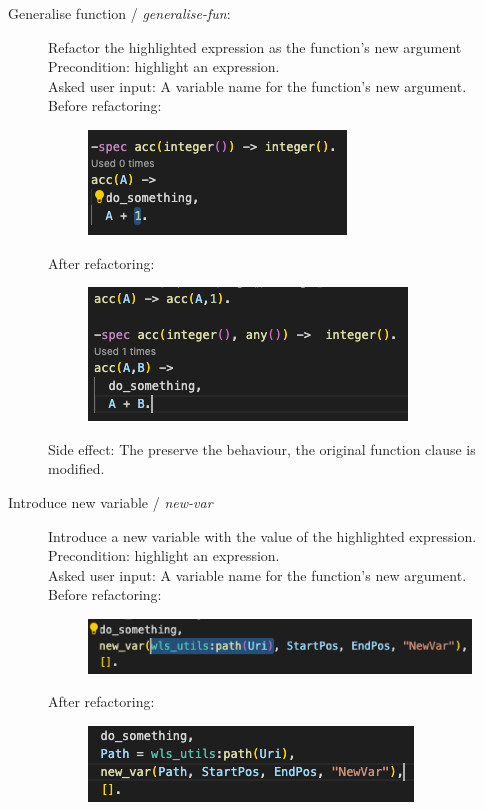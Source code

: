\begin{description}
	\item[Generalise function / \textit{generalise-fun}:] 
	Refactor the highlighted expression as the function's new argument
	\\Precondition: highlight an expression.
	\\Asked user input: A variable name for the function's new argument. 
	\\Before refactoring:
	\begin{figure}[H]
	\centering
	\includegraphics[]{images/gen_before.png}
    \end{figure}
	After refactoring:
	\begin{figure}[H]
	\centering
	\includegraphics[]{images/gen_after.png}
    \end{figure}
	Side effect: The preserve the behaviour, the original function clause is modified.
	\item[Introduce new variable / \textit{new-var}] Introduce a new variable with the value of the highlighted expression.
	\\Precondition: highlight an expression.
	\\Asked user input: A variable name for the function's new argument. 
	\\Before refactoring:
	\begin{figure}[H]
	\centering
	\includegraphics[]{images/new_var_before.png}
    \end{figure}
	After refactoring:
	\begin{figure}[H]
	\centering
	\includegraphics[]{images/new_var_after.png}

\end{figure}
\end{description}
